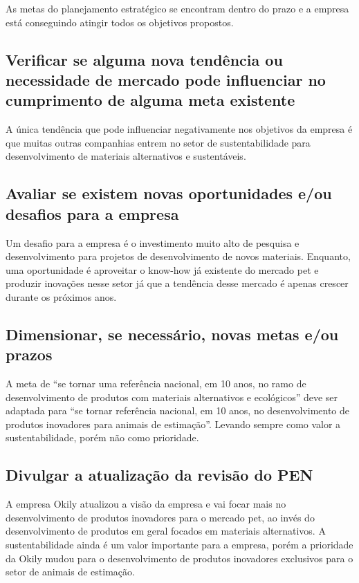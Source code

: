 \documentclass[
	12pt,				%
	openright,			%
	oneside,			%
	a4paper,			%
	english,			%
	french,				%
	spanish,			%
	brazil				%
	]{abntex2}
\begin{document}
As metas do planejamento estratégico se encontram dentro do prazo e a empresa está conseguindo atingir todos os objetivos propostos.


\subsection*{Verificar se alguma nova tendência ou necessidade de mercado pode influenciar no cumprimento de alguma meta existente}

A única tendência que pode influenciar negativamente nos objetivos da empresa é que muitas outras companhias entrem no setor de sustentabilidade para desenvolvimento de materiais alternativos e sustentáveis.


\subsection*{Avaliar se existem novas oportunidades e/ou desafios para a empresa}

Um desafio para a empresa é o investimento muito alto de pesquisa e desenvolvimento para projetos de desenvolvimento de novos materiais. Enquanto, uma oportunidade é aproveitar o know-how já existente do mercado pet e produzir inovações nesse setor já que a tendência desse mercado é apenas crescer durante os próximos anos. 

\subsection*{Dimensionar, se necessário, novas metas e/ou prazos}

A meta de “se tornar uma referência nacional, em 10 anos, no ramo de desenvolvimento de produtos com materiais alternativos e ecológicos” deve ser adaptada para “se tornar referência nacional, em 10 anos, no desenvolvimento de produtos inovadores para animais de estimação”. Levando sempre como valor a sustentabilidade, porém não como prioridade.

\subsection*{Divulgar a atualização da revisão do PEN}

A empresa Okily atualizou a visão da empresa e vai focar mais no desenvolvimento de produtos inovadores para o mercado pet, ao invés do desenvolvimento de produtos em geral focados em materiais alternativos. A sustentabilidade ainda é um valor importante para a empresa, porém a prioridade da Okily mudou para o desenvolvimento de produtos inovadores exclusivos para o setor de animais de estimação.
\end{document}
